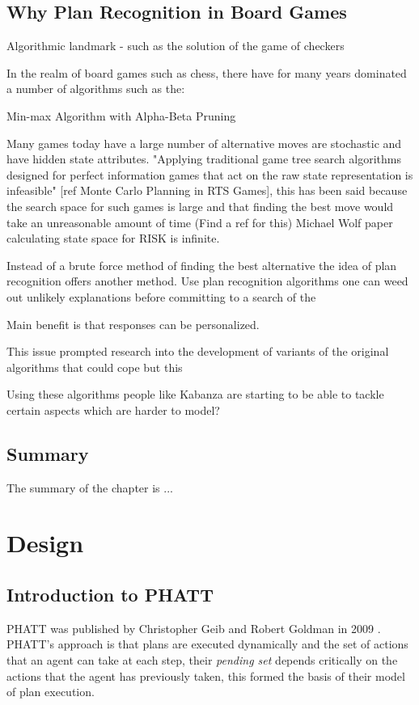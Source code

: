 \documentclass[parskip]{cs4rep}
\begin{document}
\section{Why Plan Recognition in Board Games}

Algorithmic landmark - such as the solution of the game of checkers 

In the realm of board games such as chess, there have for many years dominated a number of algorithms such as the:

Min-max Algorithm with Alpha-Beta Pruning

Many games today have a large number of alternative moves are stochastic and have hidden state attributes. "Applying traditional game tree search algorithms designed for perfect information games that act on the raw state representation is infeasible" [ref Monte Carlo Planning in RTS Games], this has been said because the search space for such games is large and that finding the best move would take an unreasonable amount of time (Find a ref for this) Michael Wolf paper calculating state space for RISK is infinite.

Instead of a brute force method of finding the best alternative the idea of plan recognition offers another method. Use plan recognition algorithms one can weed out unlikely explanations before committing to a search of the 

Main benefit is that responses can be personalized.

This issue prompted research into the development of variants of the original algorithms that could cope but this 

Using these algorithms people like Kabanza are starting to be able to tackle certain aspects which are harder to model?

\section{Summary}

The summary of the chapter is ...

\chapter{Design}

\section{Introduction to PHATT}

PHATT was published by Christopher Geib and Robert Goldman in 2009 \cite{Geib:2009:PPR:1550966.1551246}. PHATT's approach is that plans are executed dynamically and the set of actions that an agent can take at each step, their \textit{pending set} depends critically on the actions that the agent has previously taken, this formed the basis of their model of plan execution.
\end{document}
